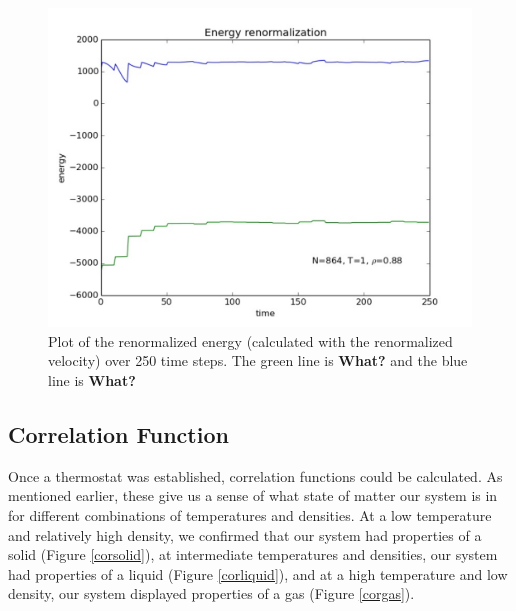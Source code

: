 \documentclass{article}
\begin{document}
\begin{multicols}{2}
\begin{figure}[H]
\begin{center}
\includegraphics[width=\linewidth]{plots/renormalizationshorttimerange.pdf}
\caption{Plot of the renormalized energy (calculated with the renormalized velocity) over 250 time steps.  The green line is \textbf{What?} and the blue line is \textbf{What?}}
\label{engrenorm}
\end{center}
\end{figure}

\subsection{Correlation Function}

Once a thermostat was established, correlation functions could be calculated.  As mentioned earlier, these give us a sense of what state of matter our system is in for different combinations of temperatures and densities.  At a low temperature and relatively high density, we confirmed that our system had properties of a solid (Figure \ref{corsolid}), at intermediate temperatures and densities, our system had properties of a liquid (Figure \ref{corliquid}), and at a high temperature and low density, our system displayed properties of a gas (Figure \ref{corgas}).  


\end{multicols}
\end{document}
